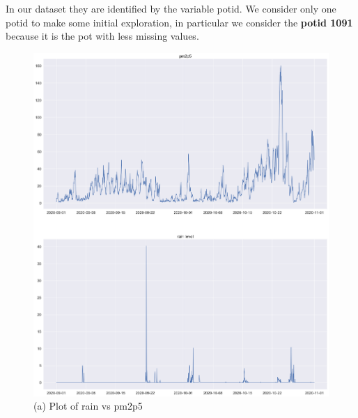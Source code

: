 \documentclass{article}
\begin{document}
In our dataset they are identified by the variable potid. 
We consider only one potid to make some initial exploration, in particular we consider the \textbf{potid 1091} because it is the pot with less missing values.

 \begin{figure}[h!]
    \centering
    \begin{minipage}[t]{0.4\textwidth}
      \centering
      \includegraphics[scale=0.18]{plotpioggia.png}
      \caption{(a) Plot of rain vs pm2p5}
    \end{minipage}\hfill
    \begin{minipage}[t]{0.4\textwidth}
      \centering

\end{minipage}
\end{figure}
\end{document}
